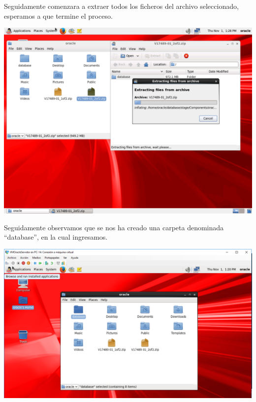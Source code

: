 Seguidamente comenzara a extraer todos los ficheros del archivo seleccionado, esperamos a que termine el proceso.
\begin{center}
	\includegraphics[width=15cm]{./Imagenes/65} 
\end{center} 

\vspace{\baselineskip}

Seguidamente observamos que se nos ha creado una carpeta denominada “database”, en la cual ingresamos.
\begin{center}
	\includegraphics[width=15cm]{./Imagenes/66} 
\end{center} 

\vspace{\baselineskip}

